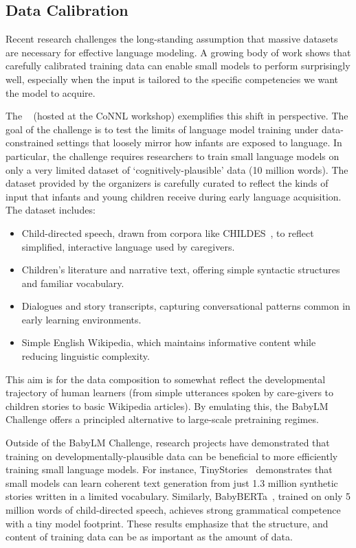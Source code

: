\subsection{Data Calibration}
Recent research challenges the long-standing assumption that massive datasets are necessary for effective language modeling. A growing body of work shows that carefully calibrated training data can enable small models to perform surprisingly well, especially when the input is tailored to the specific competencies we want the model to acquire.

The ~\citep{warstadt2023babylm1, conll2024babylm2} (hosted at the CoNNL workshop) exemplifies this shift in perspective. The goal of the challenge is to test the limits of language model training under data-constrained settings that loosely mirror how infants are exposed to language. In particular, the challenge requires researchers to train small language models on only a very limited dataset of `cognitively-plausible' data (10 million words). The dataset provided by the organizers is carefully curated to reflect the kinds of input that infants and young children receive during early language acquisition. The dataset includes:

\begin{itemize}
    \item Child-directed speech, drawn from corpora like CHILDES~\citep{macwhinney2000childes}, to reflect simplified, interactive language used by caregivers.
    \item Children's literature and narrative text, offering simple syntactic structures and familiar vocabulary.
    \item Dialogues and story transcripts, capturing conversational patterns common in early learning environments.
    \item Simple English Wikipedia, which maintains informative content while reducing linguistic complexity.
\end{itemize}

This aim is for the data composition to somewhat reflect the developmental trajectory of human learners (from simple utterances spoken by care-givers to children stories to basic Wikipedia articles). By emulating this, the BabyLM Challenge offers a principled alternative to large-scale pretraining regimes.

Outside of the BabyLM Challenge, research projects have demonstrated that training on developmentally-plausible data can be beneficial to more efficiently training small language models. For instance, TinyStories~\citep{eldan2023tinystories} demonstrates that small models can learn coherent text generation from just 1.3 million synthetic stories written in a limited vocabulary. Similarly, BabyBERTa~\citep{huebner2021babyberta}, trained on only 5 million words of child-directed speech, achieves strong grammatical competence with a tiny model footprint. These results emphasize that the structure, and content of training data can be as important as the amount of data. 

